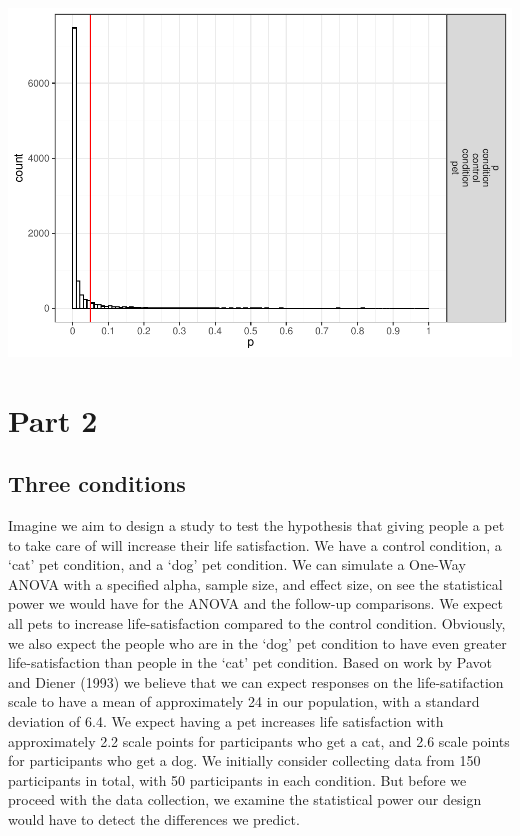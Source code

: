 \documentclass[]{book}
\begin{document}
\includegraphics{SuperpowerValidation_files/figure-latex/unnamed-chunk-25-1.pdf}

\hypertarget{part-2}{%
\section{Part 2}\label{part-2}}

\hypertarget{three-conditions}{%
\subsection{Three conditions}\label{three-conditions}}

Imagine we aim to design a study to test the hypothesis that giving people a pet to take care of will increase their life satisfaction. We have a control condition, a `cat' pet condition, and a `dog' pet condition. We can simulate a One-Way ANOVA with a specified alpha, sample size, and effect size, on see the statistical power we would have for the ANOVA and the follow-up comparisons. We expect all pets to increase life-satisfaction compared to the control condition. Obviously, we also expect the people who are in the `dog' pet condition to have even greater life-satisfaction than people in the `cat' pet condition. Based on work by Pavot and Diener (1993) we believe that we can expect responses on the life-satifaction scale to have a mean of approximately 24 in our population, with a standard deviation of 6.4. We expect having a pet increases life satisfaction with approximately 2.2 scale points for participants who get a cat, and 2.6 scale points for participants who get a dog. We initially consider collecting data from 150 participants in total, with 50 participants in each condition. But before we proceed with the data collection, we examine the statistical power our design would have to detect the differences we predict.
\end{document}
